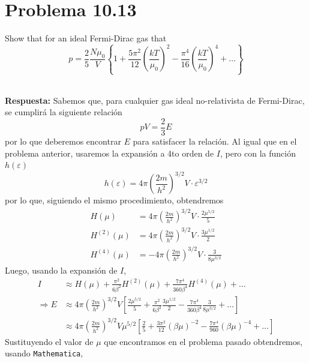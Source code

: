 \documentclass[]{article}
\numberwithin{equation}{section}
\newcommand{\0}{\textcolor{gray}{0}}
\newcommand{\resp}{
	\\
	
	\textbf{Respuesta:} }
\begin{document}
\section{Problema 10.13}
Show that for an ideal Fermi-Dirac gas that
\begin{equation}
	p = \frac{2}{5} \frac{N \mu_0}{V} \left\{1 + \frac{5\pi^2}{12} \left(\frac{kT}{\mu_0}\right)^2 - \frac{\pi^4}{16} \left(\frac{kT}{\mu_0}\right)^4 + \ldots \right\}
\end{equation}
\resp Sabemos que, para cualquier gas ideal no-relativista de Fermi-Dirac, se cumplirá la siguiente relación
\begin{equation}
	pV = \frac{2}{3} E
\end{equation}
por lo que deberemos encontrar $E$ para satisfacer la relación. Al igual que en el problema anterior, usaremos la expansión a 4to orden de $I$, pero con la función $h(\varepsilon)$
\begin{equation}
	h(\varepsilon)= 4 \pi\left(\frac{2 m}{h^2}\right)^{3 / 2} V \cdot \varepsilon^{3 / 2}
\end{equation}
por lo que, siguiendo el mismo procedimiento, obtendremos
\begin{align*}
	H(\mu) &= 4 \pi\left(\frac{2 m}{h^2}\right)^{3 / 2} V \cdot \frac{2 \mu^{5/2}}{5}\\
	H^{(2)}(\mu) &= 4 \pi\left(\frac{2 m}{h^2}\right)^{3 / 2} V \cdot \frac{3 \mu^{1/2}}{2}\\
	H^{(4)}(\mu) &= - 4 \pi\left(\frac{2 m}{h^2}\right)^{3 / 2} V \cdot \frac{3}{8 \mu^{3/2}}
\end{align*}
Luego, usando la expansión de $I$,
\begin{align}
	I &\approx H(\mu) + \frac{\pi^2}{6 \beta^2} H^{(2)}(\mu) + \frac{7 \pi^4}{360 \beta^4} H^{(4)}(\mu) + \ldots \nonumber\\
	\Rightarrow E &\approx 4 \pi\left(\frac{2 m}{h^2}\right)^{3 / 2} V  \left[\frac{2 \mu^{5/2}}{5} + \frac{\pi^2}{6 \beta^2} \frac{3 \mu^{1/2}}{2} - \frac{7 \pi^4}{360 \beta^4} \frac{3}{8 \mu^{3/2}} + \ldots \right] \nonumber\\
	&\approx 4 \pi\left(\frac{2 m}{h^2}\right)^{3 / 2} V  \mu^{5/2} \left[\frac{2}{5} + \frac{3 \pi^2}{12} (\beta \mu)^{-2} - \frac{7 \pi^4}{960} (\beta \mu)^{-4} + \ldots \right]
\end{align}
Sustituyendo el valor de $\mu$ que encontramos en el problema pasado obtendremos, usando \texttt{Mathematica},
\end{document}
